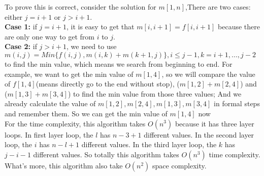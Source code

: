 \documentclass[paper=a4, fontsize=11pt]{scrartcl} %
\numberwithin{equation}{section} %
\numberwithin{figure}{section} %
\numberwithin{table}{section} %
\begin{document}
To prove this is correct, consider the solution for $m[1,n]$,There are two cases: either $j=i+1$ or $j>i+1$.\\
\textbf{Case 1:} if $j=i+1$, it is easy to get that  $m[i,i+1]=f[i,i+1]$ because there are only one way to get from $i$ to $j$.\\
\textbf{Case 2:} if $j>i+1$, we need to use $m(i,j)=Min\{ f(i,j),m(i,k)+m(k+1,j) \},i\leq j-1, k=i+1,...,j-2$ to find the min value, which means we search from beginning to end. For example, we want to get the min value of $m[1,4]$, so we will compare the value of $f[1,4]$(means directly go to the end without stop), ($m[1,2]+m[2,4]$) and ($m[1,3]+m[3,4]$) to find the min value from those three values; And we already calculate the value of $m[1,2], m[2,4], m[1,3], m[3,4]$ in formal steps and remember them. So we can get the min value of $m[1,4]$ now\\
For the time complexity, this algorithm takes $O(n^3)$ because it has three layer loops. In first layer loop, the $l$ has $n-3+1$ different values. In the second layer loop, the $i$ has $n-l+1$ different values. In the third layer loop, the $k$ has $j-i-1$ different values. So totally this algorithm takes $O(n^3)$ time complexity. What's more, this algorithm also take $O(n^2)$ space complexity.

\vspace{2cm}
\end{document}
